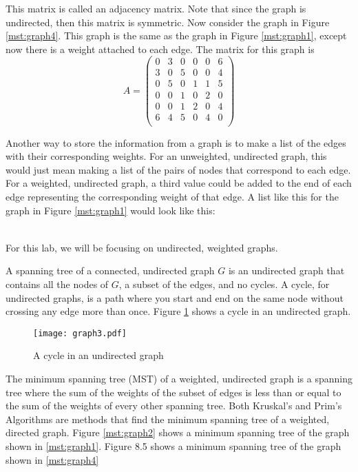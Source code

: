 This matrix is called an adjacency matrix.
Note that since the graph is undirected, then this matrix is symmetric.
Now consider the graph in Figure \ref{mst:graph4}.  This graph is the same as the graph in Figure \ref{mst:graph1}, except now there is a weight attached to each edge.  The matrix for this graph is
\[
A = \begin{pmatrix}
0 & 3 & 0 & 0 & 0 & 6\\
3 & 0 & 5 & 0 & 0 & 4\\
0 & 5 & 0 & 1 & 1 & 5\\
0 & 0 & 1 & 0 & 2 & 0\\
0 & 0 & 1 & 2 & 0 & 4\\
6 & 4 & 5 & 0 & 4 & 0\\
\end{pmatrix}
\]

Another way to store the information from a graph is to make a list of the edges with their corresponding weights.
For an unweighted, undirected graph, this would just mean making a list of the pairs of nodes that correspond to each edge.
For a weighted, undirected graph, a third value could be added to the end of each edge representing the corresponding weight of that edge.
A list like this for the graph in Figure \ref{mst:graph1} would look like this:

\begin{align*}
[('A', 'B'),
 ('B', 'C'),
 ('B', 'F'),
 ('C', 'D'),\\
 ('C', 'E'),
 ('C', 'F'),
 ('D', 'E'),
 ('E', 'F')]
\end{align*}

For this lab, we will be focusing on undirected, weighted graphs.

A spanning tree of a connected, undirected graph $G$ is an undirected graph that contains all the nodes of $G$, a subset of the edges, and no cycles.
A cycle, for undirected graphs, is a path where you start and end on the same node without crossing any edge more than once.
Figure \ref{mst:graph3} shows a cycle in an undirected graph.

\begin{figure}[H]
\texttt{[image: graph3.pdf]}
\caption{A cycle in an undirected graph}
\label{mst:graph3}
\end{figure}

The minimum spanning tree (MST) of a weighted, undirected graph is a spanning tree where the sum of the weights of the subset of edges is less than or equal to the sum of the weights of every other spanning tree.
Both Kruskal's and Prim's Algorithms are methods that find the minimum spanning tree of a weighted, directed graph.
Figure \ref{mst:graph2} shows a minimum spanning tree of the graph shown in \ref{mst:graph1}.
Figure 8.5 shows a minimum spanning tree of the graph shown in \ref{mst:graph4}


